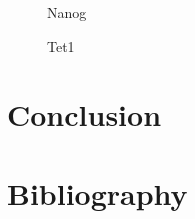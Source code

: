 \begin{figure}
\centering
\begin{minipage}{0.7\textwidth}
\centering
\graphicspath{{../Plots/}}

\caption{Nanog}
\label{pl:Nanog}
\end{minipage}
\end{figure}

\begin{figure}
\centering
\begin{minipage}{0.7\textwidth}
\centering
\graphicspath{{../Plots/}}

\caption{Tet1}
\label{pl:Tet1}
\end{minipage}
\end{figure}

\section{Conclusion}

\newpage
\section*{Bibliography}
\nocite{*}
\printbibliography[heading=none, keyword={secondary}]



